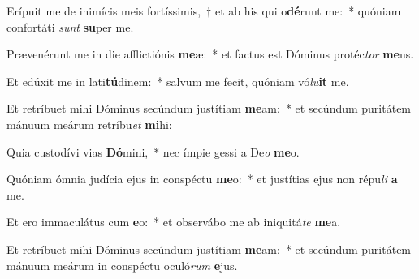 \item Erípuit me de inimícis meis fortíssimis,~† et ab his qui o\textbf{dé}runt me:~* quóniam confortáti \textit{sunt} \textbf{su}per me.
\item Prævenérunt me in die afflictiónis \textbf{me}æ:~* et factus est Dóminus protéc\textit{tor} \textbf{me}us.
\item Et edúxit me in lati\textbf{tú}dinem:~* salvum me fecit, quóniam vó\textit{lu}\textbf{it} me.
\item Et retríbuet mihi Dóminus secúndum justítiam \textbf{me}am:~* et secúndum puritátem mánuum meárum retríbu\textit{et} \textbf{mi}hi:
\item Quia custodívi vias \textbf{Dó}mini,~* nec ímpie gessi a De\textit{o} \textbf{me}o.
\item Quóniam ómnia judícia ejus in conspéctu \textbf{me}o:~* et justítias ejus non répu\textit{li} \textbf{a} me.
\item Et ero immaculátus cum \textbf{e}o:~* et observábo me ab iniquitá\textit{te} \textbf{me}a.
\item Et retríbuet mihi Dóminus secúndum justítiam \textbf{me}am:~* et secúndum puritátem mánuum meárum in conspéctu oculó\textit{rum} \textbf{e}jus.
